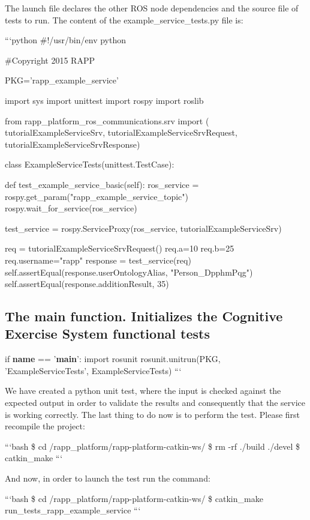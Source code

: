 The launch file declares the other R\-O\-S node dependencies and the source file of tests to run. The content of the {\ttfamily example\-\_\-service\-\_\-tests.\-py} file is\-:

```python \#!/usr/bin/env python

\#\-Copyright 2015 R\-A\-P\-P

P\-K\-G='rapp\-\_\-example\-\_\-service'

import sys import unittest import rospy import roslib

from rapp\-\_\-platform\-\_\-ros\-\_\-communications.\-srv import ( tutorial\-Example\-Service\-Srv, tutorial\-Example\-Service\-Srv\-Request, tutorial\-Example\-Service\-Srv\-Response)

class Example\-Service\-Tests(unittest.\-Test\-Case)\-: \begin{DoxyVerb}def test_example_service_basic(self):
    ros_service = rospy.get_param("rapp_example_service_topic")
    rospy.wait_for_service(ros_service)

    test_service = rospy.ServiceProxy(ros_service, tutorialExampleServiceSrv)

    req = tutorialExampleServiceSrvRequest()
    req.a=10
    req.b=25
    req.username="rapp"
    response = test_service(req)
    self.assertEqual(response.userOntologyAlias, "Person_DpphmPqg")
    self.assertEqual(response.additionResult, 35)
\end{DoxyVerb}


\subsection*{The main function. Initializes the Cognitive Exercise System functional tests}

if {\bfseries name} == '{\bfseries main}'\-: import rosunit rosunit.\-unitrun(P\-K\-G, 'Example\-Service\-Tests', Example\-Service\-Tests) ```

We have created a python unit test, where the input is checked against the expected output in order to validate the results and consequently that the service is working correctly. The last thing to do now is to perform the test. Please first recompile the project\-:

```bash \$ cd /rapp\-\_\-platform/rapp-\/platform-\/catkin-\/ws/ \$ rm -\/rf ./build ./devel \$ catkin\-\_\-make ```

And now, in order to launch the test run the command\-:

```bash \$ cd /rapp\-\_\-platform/rapp-\/platform-\/catkin-\/ws/ \$ catkin\-\_\-make run\-\_\-tests\-\_\-rapp\-\_\-example\-\_\-service ```

